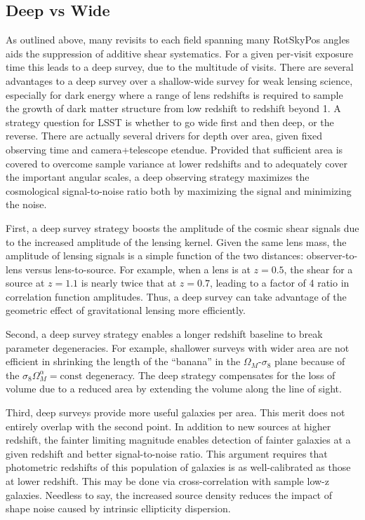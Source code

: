 \subsection{Deep vs Wide}

As outlined above, many revisits to each field spanning many RotSkyPos angles
aids the suppression of additive shear systematics.  For a given per-visit
exposure time this leads to a deep survey, due to the multitude of visits.
There are several advantages to a deep survey over a shallow-wide survey for
weak lensing science, especially for dark energy where a range of lens redshifts
is required to sample the growth of dark matter structure from low redshift to
redshift beyond 1.  A strategy question for LSST is whether to go wide first and
then deep, or the reverse.  There are actually several drivers for depth over
area, given fixed observing time and camera+telescope etendue.  Provided that
sufficient area is covered to overcome sample variance at lower redshifts and to
adequately cover the important angular scales, a deep observing strategy
maximizes the cosmological signal-to-noise ratio both by maximizing the signal
and minimizing the noise.

First, a deep survey strategy boosts the amplitude of the cosmic shear signals
due to the increased amplitude of the lensing kernel.  Given the same lens mass,
the amplitude of lensing signals is a simple function of the two distances:
observer-to-lens versus lens-to-source.  For example, when a lens is at $z =
0.5$, the shear for a source at $z = 1.1$ is nearly twice that at $z = 0.7$,
leading to a factor of 4 ratio in correlation function amplitudes.  Thus, a deep
survey can take advantage of the geometric effect of gravitational lensing more
efficiently.

Second, a deep survey strategy enables a longer redshift baseline to break
parameter degeneracies.  For example, shallower surveys with wider area are not
efficient in shrinking the length of the ``banana'' in the $\Omega_M$-$\sigma_8$
plane because of the $\sigma_8 \Omega_M^\alpha = \mathrm{const}$ degeneracy.
The deep strategy compensates for the loss of volume due to a reduced area by
extending the volume along the line of sight.

Third, deep surveys provide more useful galaxies per area.  This merit does not
entirely overlap with the second point.  In addition to new sources at higher
redshift, the fainter limiting magnitude enables detection of fainter galaxies
at a given redshift and better signal-to-noise ratio.  This argument requires
that photometric redshifts of this population of galaxies is as well-calibrated
as those at lower redshift.  This may be done via cross-correlation with sample
low-z galaxies.  Needless to say, the increased source density reduces the
impact of shape noise caused by intrinsic ellipticity dispersion.

